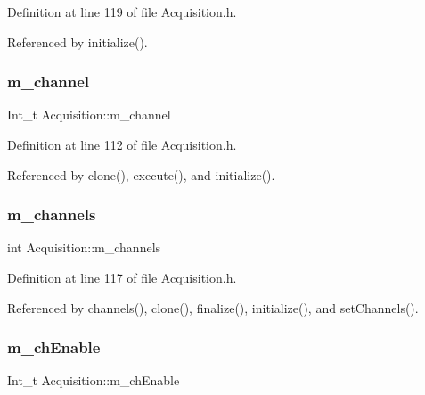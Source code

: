 Definition at line 119 of file Acquisition.\+h.



Referenced by initialize().

\mbox{\label{classAcquisition_a9233a189179591c0c2f2639a3e6c13f6}} 
\subsubsection{\texorpdfstring{m\+\_\+channel}{m\_channel}}
{\footnotesize\ttfamily Int\+\_\+t Acquisition\+::m\+\_\+channel\hspace{0.3cm}{\ttfamily [private]}}



Definition at line 112 of file Acquisition.\+h.



Referenced by clone(), execute(), and initialize().

\mbox{\label{classAcquisition_aedc8b29f322ef00540797fbd0d5112d1}} 
\subsubsection{\texorpdfstring{m\+\_\+channels}{m\_channels}}
{\footnotesize\ttfamily int Acquisition\+::m\+\_\+channels\hspace{0.3cm}{\ttfamily [private]}}



Definition at line 117 of file Acquisition.\+h.



Referenced by channels(), clone(), finalize(), initialize(), and set\+Channels().

\mbox{\label{classAcquisition_a217269bc403d9fd271a1701c98afb30e}} 
\subsubsection{\texorpdfstring{m\+\_\+ch\+Enable}{m\_chEnable}}
{\footnotesize\ttfamily Int\+\_\+t Acquisition\+::m\+\_\+ch\+Enable\hspace{0.3cm}{\ttfamily [private]}}



